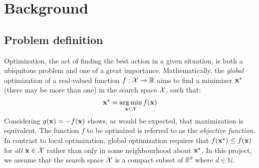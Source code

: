 
\chapter{Background} %

\label{Chapter1} %


\section{Problem definition}

Optimization, the act of finding the best action in a given situation, is both a ubiquitous problem and one of a great importance. Mathematically, the \textit{global} optimization of a real-valued function $f:\mathcal{X} \to \mathbb{R}$ aims to find a minimizer $\mathbf{x}^\star$ (there may be more than one) in the search space $\mathcal{X}$, such that:
%
\begin{equation} \label{eq:1.1}
\mathbf{x}^\star = \operatorname*{arg\,min}_{\mathbf{x}\in\mathcal{X}} f(\mathbf{x})
\end{equation}
%
Considering $g(\mathbf{x}) = -f(\mathbf{x})$ shows, as would be expected, that maximization is equivalent. The function $f$ to be optimized is referred to as the \textit{objective function}. In contrast to local optimization, global optimization requires that $f(\mathbf{x}^\star) \leq f(\mathbf{x})$ for \textit{all} $\mathbf{x} \in \mathcal{X}$ rather than only in some neighbourhood about $\mathbf{x}^\star$. In this project, we assume that the search space $\mathcal{X}$ is a compact subset of  $\mathbb{R}^d$ where $d \in \mathbb{N}$.

